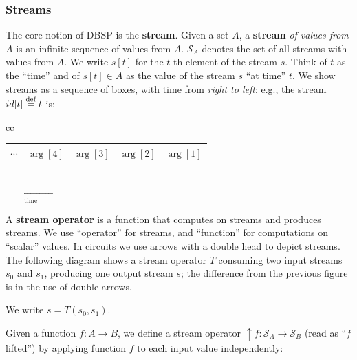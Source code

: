 \documentclass[twocolumn
]{svjour3}
\numberwithin{equation}{section}
\newcommand{\dbsp}{DBSP\xspace}
\newcommand{\defined}[1]{\textbf{#1}\index{}}
\newcommand{\stream}[1]{\ensuremath{\mathcal{S}_{#1}}}
\newcommand{\defn}{\stackrel{\textrm{\scriptsize def}}{=}}
\newcommand{\lift}[1]{{\uparrow}#1}
\newcommand{\sv}[1]{ %
\setsepchar{ }
\readlist\arg{#1}
\setlength\tabcolsep{4pt}
\begin{tabular}{|c|c|c|c|c|} \hline
  \!\ensuremath{\cdots}\! &
  \!\ensuremath{\arg[4]}\! &
  \!\ensuremath{\arg[3]}\! &
  \!\ensuremath{\arg[2]}\! &
  \!\ensuremath{\arg[1]}\!
  \\ \hline
\end{tabular}
}
\begin{document}
\subsubsection{Streams}

The core notion of \dbsp is the \textbf{stream}.  Given a set $A$, a
\defined{stream} \emph{of values from $A$} is an infinite sequence of
values from $A$.  $\stream{A}$ denotes the set of all streams with
values from $A$.  We write $s[t]$ for the $t$-th element of the stream
$s$.  Think of $t$ as the ``time'' and of $s[t]\in A$ as the value of
the stream $s$ ``at time'' $t$.  We show streams as a sequence of
boxes, with time from \emph{right to left}: e.g., the stream $id[t]
\defn t$ is:
%
\begin{center}
\begin{tabular}{cc}
  \sv{0 1 2 3 4} \\
  $\xleftarrow[\hspace{1cm}\mathrm{time}\hspace{1cm}]{}$
\end{tabular}
\end{center}

A \defined{stream operator} is a function that computes on streams and
produces streams.  We use ``operator'' for streams, and ``function''
for computations on ``scalar'' values.  In circuits we use arrows with
a double head to depict streams.  The following diagram shows a stream
operator $T$ consuming two input streams $s_0$ and $s_1$, producing
one output stream $s$; the difference from the previous figure is in
the use of double arrows.
%
\begin{center}
\end{center}
%
We write $s = T(s_0, s_1)$.

Given a function $f: A \to B$, we define a stream operator $\lift{f}
:\stream{A} \to \stream{B}$ (read as ``$f$ lifted'') by applying
function $f$ to each input value independently:
\end{document}
